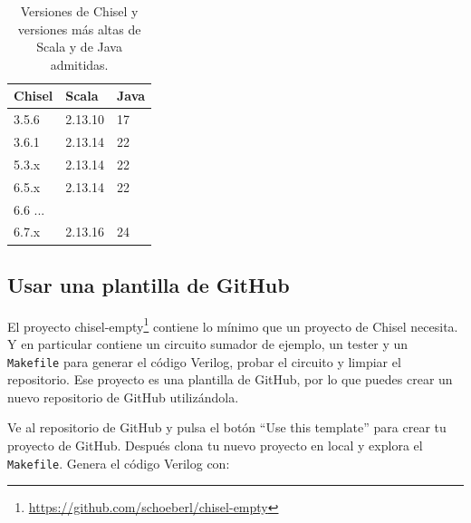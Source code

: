 \documentclass[%
    10pt,
    headinclude, footinclude=false,
    openright, %
    notitlepage,
    cleardoublepage=empty,
    headsepline,
    numbers=noenddot,
    bibliography=totoc, index=totoc,
    ]{scrbook}
\newcommand{\code}[1]{{\lstinline[basicstyle=\small\ttfamily]{#1}}}
\newcommand{\myref}[2]{\href{#1}{#2}}
\renewcommand{\myref}[2]{{#2}{\footnote{\url{#1}}}}
\begin{document}
\begin{table}[H]
 \centering
  \begin{tabular}{lll}
    \toprule
    Chisel & Scala & Java \\
    \midrule
    3.5.6 & 2.13.10 & 17 \\
    3.6.1 & 2.13.14 & 22 \\
    5.3.x & 2.13.14 & 22 \\
    6.5.x & 2.13.14 & 22 \\
    6.6 ... \\
    6.7.x & 2.13.16 & 24 \\
    \bottomrule
  \end{tabular}
  \caption{Versiones de Chisel y versiones más altas de Scala y de Java admitidas.}
 \label{tab:versions}
\end{table}




\subsection{Usar una plantilla de GitHub}


El proyecto \myref{https://github.com/schoeberl/chisel-empty}{chisel-empty} contiene lo mínimo que un proyecto de
Chisel necesita. Y en particular contiene un circuito sumador de ejemplo, un tester y un \code{Makefile} para generar
el código Verilog, probar el circuito y limpiar el repositorio.
Ese proyecto es una plantilla de GitHub, por lo que puedes crear un nuevo repositorio de 
GitHub utilizándola.


Ve al repositorio de GitHub y pulsa el botón ``Use this template'' para crear
tu proyecto de GitHub. Después clona tu nuevo proyecto en local y explora el \code{Makefile}.
Genera el código Verilog con:
\end{document}
